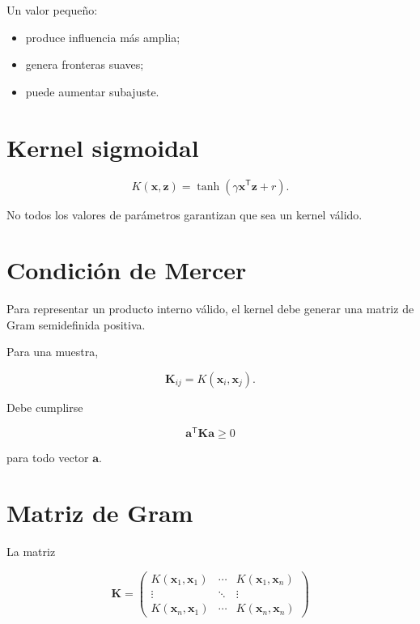 \documentclass[
  spanish,
  10.5pt,
  letterpaper,
  DIV=11,
  numbers=noendperiod,
  oneside,
  open=any]{scrreprt}
\providecommand{\tightlist}{%
  \setlength{\itemsep}{0pt}\setlength{\parskip}{0pt}}
\theoremstyle{definition}
\theoremstyle{definition}
\theoremstyle{plain}
\theoremstyle{remark}
\begin{document}
Un valor pequeño:

\begin{itemize}
\tightlist
\item
  produce influencia más amplia;
\item
  genera fronteras suaves;
\item
  puede aumentar subajuste.
\end{itemize}

\section*{Kernel sigmoidal}\label{kernel-sigmoidal}


\[
K(\mathbf{x},\mathbf{z})
=
\tanh
\left(
\gamma
\mathbf{x}^{\mathsf T}\mathbf{z}
+r
\right).
\]

No todos los valores de parámetros garantizan que sea un kernel válido.

\section*{Condición de Mercer}\label{condiciuxf3n-de-mercer}


Para representar un producto interno válido, el kernel debe generar una
matriz de Gram semidefinida positiva.

Para una muestra,

\[
\mathbf{K}_{ij}
=
K(\mathbf{x}_i,\mathbf{x}_j).
\]

Debe cumplirse

\[
\mathbf{a}^{\mathsf T}
\mathbf{K}
\mathbf{a}
\geq 0
\]

para todo vector \(\mathbf{a}\).

\section*{Matriz de Gram}\label{matriz-de-gram}


La matriz

\[
\mathbf{K}
=
\begin{pmatrix}
K(\mathbf{x}_1,\mathbf{x}_1) & \cdots & K(\mathbf{x}_1,\mathbf{x}_n)\\
\vdots & \ddots & \vdots\\
K(\mathbf{x}_n,\mathbf{x}_1) & \cdots & K(\mathbf{x}_n,\mathbf{x}_n)
\end{pmatrix}
\]
\end{document}
